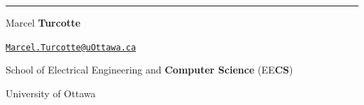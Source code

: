 \documentclass[
  letterpaper,
  DIV=11,
  numbers=noendperiod]{scrartcl}
\begin{document}
\begin{center}\rule{0.5\linewidth}{0.5pt}\end{center}

Marcel \textbf{Turcotte}

\href{mailto:Marcel.Turcotte@uOttawa.ca}{\nolinkurl{Marcel.Turcotte@uOttawa.ca}}

School of Electrical Engineering and \textbf{Computer Science}
(EE\textbf{CS})

University of Ottawa
\end{document}
